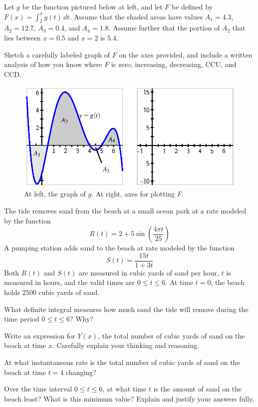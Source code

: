 \begin{exercises} 
	\item Let $g$ be the function pictured below at left, and let $F$ be defined by $F(x) = \int_{2}^x g(t) \, dt.$ Assume that the shaded areas have values $A_1 = 4.3$, $A_2 = 12.7$, $A_3 = 0.4$, and $A_4 = 1.8$.  Assume further that the portion of $A_2$ that lies between $x = 0.5$ and $x = 2$ is $5.4$.  
  
  Sketch a carefully labeled graph of $F$ on the axes provided, and include a written analysis of how you know where $F$ is zero, increasing, decreasing, CCU, and CCD. 
  
  \begin{figure}[h]
  \begin{center}
\includegraphics{figures/5_2_Ez1.eps}
\end{center}
\caption{At left, the graph of $g$.  At right, axes for plotting $F$.} \label{F:5.2.Ez1}
  \end{figure}
	
	\item The tide removes sand from the beach at a small ocean park at a rate modeled by the function $$R(t) = 2 + 5\sin \left( \frac{4\pi t}{25} \right)$$
A pumping station adds sand to the beach at rate modeled by the function
$$S(t) = \frac{15t}{1+3t}$$
Both $R(t)$ and $S(t)$ are measured in cubic yards of sand per hour, $t$ is measured in hours, and the valid times are $0 \le t \le 6$.  At time $t = 0$, the beach holds 2500 cubic yards of sand.

	\ba
		\item What definite integral measures how much sand the tide will remove during the time period $0 \le t \le 6$?  Why? 
		\item Write an expression for $Y(x)$, the total number of cubic yards of sand on the beach at time $x$.  Carefully explain your thinking and reasoning.
		\item At what instantaneous rate is the total number of cubic yards of sand on the beach at time $t = 4$ changing?  
		\item Over the time interval $0 \le t \le 6$, at what time $t$ is the amount of sand on the beach least?  What is this minimum value?  Explain and justify your answers fully.
	\ea
	

\end{exercises}
